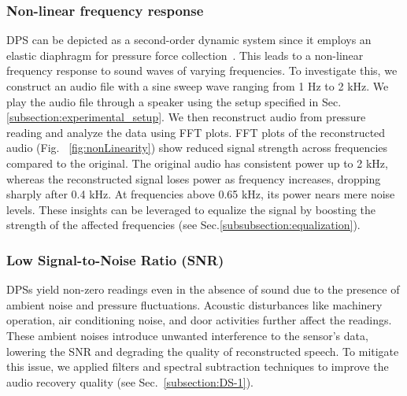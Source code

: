 \subsubsection{\textbf{Non-linear frequency response}}
\label{subsection:non-linearity}

DPS can be depicted as a second-order dynamic system since it employs an elastic diaphragm for pressure force collection~\cite{whitmore2009improved}.
This leads to a non-linear frequency response to sound waves of varying frequencies.
To investigate this, we construct an audio file with a sine sweep wave ranging from 1 Hz to 2 kHz. We play the audio file through a speaker using the setup specified in Sec. \ref{subsection:experimental_setup}. We then reconstruct audio from pressure reading and analyze the data using FFT plots.
FFT plots of the reconstructed audio (Fig. ~\ref{fig:nonLinearity}) show reduced signal strength across frequencies compared to the original. 
{The original audio has consistent power up to 2 kHz, whereas the reconstructed signal loses power as frequency increases, dropping sharply after 0.4 kHz. }
At frequencies above 0.65 kHz, its power nears mere noise levels.
These insights can be leveraged to equalize the signal by boosting the strength of the affected frequencies (see Sec.\ref{subsubsection:equalization}).

\subsubsection{\textbf{Low Signal-to-Noise Ratio (SNR)}}
\label{subsection:lowSNR} 
DPSs yield non-zero readings even in the absence of sound due to the presence of ambient noise and pressure fluctuations.
Acoustic disturbances like machinery operation, air conditioning noise, and door activities further affect the readings.
These ambient noises introduce unwanted interference to the sensor's data, lowering the SNR and degrading the quality of reconstructed speech.
To mitigate this issue, we applied filters and spectral subtraction techniques to improve the audio recovery quality (see Sec.~\ref{subsection:DS-1}).
